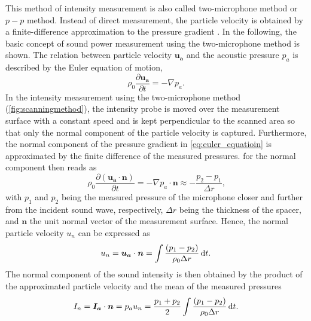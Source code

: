 This method of intensity measurement is also called two-microphone method or $p-p$ method.
Instead of direct measurement, the particle velocity is obtained by a finite-difference approximation to the pressure gradient \cite{jocobsen_2005, moschioni_2008}.
In the following, the basic concept of sound power measurement using the two-microphone method is shown. The relation between particle velocity $\boldsymbol{u_a}$ and the acoustic pressure $p_a$ is described by the Euler equation of motion,
\begin{equation}
    \rho_0 \frac{\partial \boldsymbol{u_a}}{\partial t} = -\nabla p_a \text{.} \label{eq:euler_equatioin}
\end{equation}
In the intensity measurement using the two-microphone method (\cref{fig:scanningmethod}), the intensity probe is moved over the measurement surface with a constant speed and is kept perpendicular to the scanned area so that only the normal component of the particle velocity is captured. Furthermore, the normal component of the pressure gradient in \cref{eq:euler_equatioin} is approximated by the finite difference of the measured pressures.  for the normal component then reads as
\begin{equation}
	\rho_0\frac{\partial(\boldsymbol{u_a} \cdot \boldsymbol{n})}{\partial t} = -\nabla p_a \cdot \boldsymbol{n} \approx -\frac{p_2 - p_1}{\Delta r}\text{,}
\end{equation}
with $p_1$ and $p_2$ being the measured pressure of the microphone closer and further from the incident sound wave, respectively, $\Delta r$ being the thickness of the spacer, and $\boldsymbol{n}$ the unit normal vector of the measurement surface. Hence, the normal particle velocity $u_n$ can be expressed as
\begin{equation}
   u_n = \boldsymbol{u_a} \cdot \boldsymbol{n} = \int\frac{(p_1 - p_2)}{\rho_0 \Delta r}\dif t \text{.}
\end{equation}
The normal component of the sound intensity is then obtained by the product of the approximated particle velocity and the mean of the measured pressures
\begin{equation}
    I_n = \boldsymbol{I_a} \cdot \boldsymbol{n} = p_a u_n = \frac{p_1 + p_2}{2} \int\frac{(p_1 - p_2)}{\rho_0 \Delta r}\dif t\text{.}
\end{equation}
